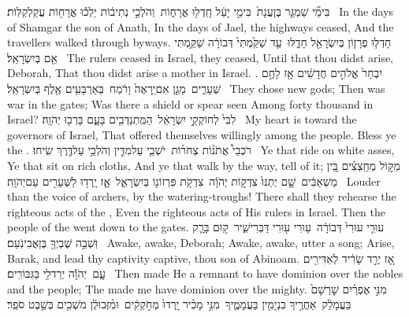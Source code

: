 {בִּימֵ֞י שַׁמְגַּ֤ר בֶּן\maqqaf עֲנָת֙ \setuma  בִּימֵ֣י יָעֵ֔ל חָֽדְל֖וּ אֳרָח֑וֹת \setuma  וְהֹלְכֵ֣י נְתִיב֔וֹת יֵלְכ֕וּ אֳרָח֖וֹת עֲקַלְקַלּֽוֹת׃ \setuma }
{In the days of Shamgar the son of Anath, In the days of Jael, the highways ceased, And the travellers walked through byways.}
{חָדְל֧וּ פְרָז֛וֹן בְּיִשְׂרָאֵ֖ל חָדֵ֑לּוּ \setuma  עַ֤ד שַׁקַּ֙מְתִּי֙ דְּבוֹרָ֔ה שַׁקַּ֥מְתִּי אֵ֖ם בְּיִשְׂרָאֵֽל׃ \setuma }
{The rulers ceased in Israel, they ceased, Until that thou didst arise, Deborah, That thou didst arise a mother in Israel. .}
{יִבְחַר֙ אֱלֹהִ֣ים חֲדָשִׁ֔ים אָ֖ז לָחֶ֣ם שְׁעָרִ֑ים \setuma  מָגֵ֤ן אִם\maqqaf יֵֽרָאֶה֙ וָרֹ֔מַח \setuma  בְּאַרְבָּעִ֥ים אֶ֖לֶף בְּיִשְׂרָאֵֽל׃ \setuma }
{They chose new gods; Then was war in the gates; Was there a shield or spear seen Among forty thousand in Israel?}
{לִבִּי֙ לְחוֹקְקֵ֣י יִשְׂרָאֵ֔ל \setuma  הַמִּֽתְנַדְּבִ֖ים בָּעָ֑ם בָּרְכ֖וּ יְהֹוָֽה׃ \setuma }
{My heart is toward the governors of Israel, That offered themselves willingly among the people. Bless ye the \lord.}
{רֹכְבֵי֩ אֲתֹנ֨וֹת צְחֹר֜וֹת \setuma  יֹשְׁבֵ֧י עַל\maqqaf מִדִּ֛ין וְהֹלְכֵ֥י עַל\maqqaf דֶּ֖רֶךְ שִֽׂיחוּ׃ \setuma }
{Ye that ride on white asses, Ye that sit on rich cloths, And ye that walk by the way, tell of it;}
{מִקּ֣וֹל מְחַֽצְצִ֗ים בֵּ֚ין מַשְׁאַבִּ֔ים \setuma  שָׁ֤ם יְתַנּוּ֙ צִדְק֣וֹת יְהֹוָ֔ה \setuma  צִדְקֹ֥ת פִּרְזוֹנ֖וֹ בְּיִשְׂרָאֵ֑ל \setuma  אָ֛ז יָֽרְד֥וּ לַשְּׁעָרִ֖ים עַם\maqqaf יְהֹוָֽה׃ \setuma }
{Louder than the voice of archers, by the watering-troughs! There shall they rehearse the righteous acts of the \lord, Even the righteous acts of His rulers in Israel. Then the people of the \lord\space went down to the gates.}
{עוּרִ֤י עוּרִי֙ דְּבוֹרָ֔ה \setuma  ע֥וּרִי ע֖וּרִי דַּבְּרִי\maqqaf שִׁ֑יר \setuma  ק֥וּם בָּרָ֛ק וּֽשְׁבֵ֥ה שֶׁבְיְךָ֖ בֶּן\maqqaf אֲבִינֹֽעַם׃ \setuma }
{Awake, awake, Deborah; Awake, awake, utter a song; Arise, Barak, and lead thy captivity captive, thou son of Abinoam.}
{אָ֚ז יְרַ֣ד שָׂרִ֔יד לְאַדִּירִ֖ים עָ֑ם \setuma  יְהֹוָ֕ה יְרַד\maqqaf לִ֖י בַּגִּבּוֹרִֽים׃ \setuma }
{Then made He a remnant to have dominion over the nobles and the people; The \lord\space made me have dominion over the mighty.}
{מִנִּ֣י אֶפְרַ֗יִם שׇׁרְשָׁם֙ בַּעֲמָלֵ֔ק \setuma  אַחֲרֶ֥יךָ בִנְיָמִ֖ין בַּעֲמָמֶ֑יךָ \setuma  מִנִּ֣י מָכִ֗יר יָֽרְדוּ֙ מְחֹ֣קְקִ֔ים \setuma  וּמִ֨זְּבוּלֻ֔ן מֹשְׁכִ֖ים בְּשֵׁ֥בֶט סֹפֵֽר׃ \setuma }
